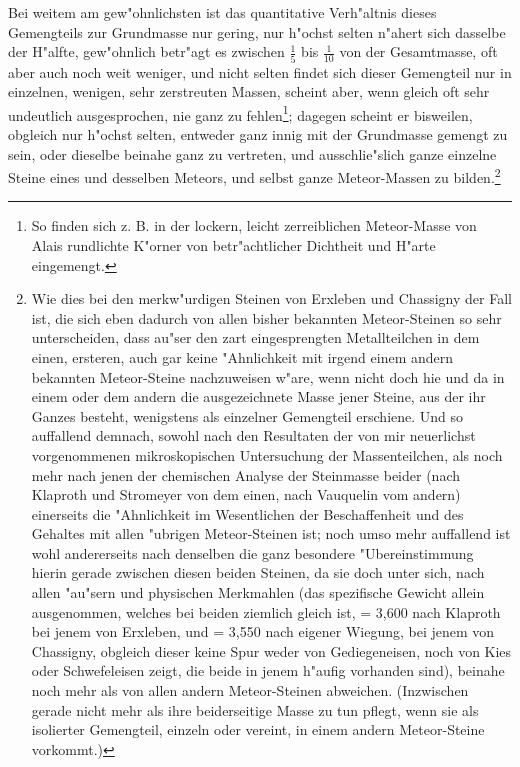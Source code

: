\documentclass[a4paper, 11pt, oneside, german]{article}
\begin{document}
Bei weitem am gew"ohnlichsten ist das quantitative Verh"altnis dieses Gemengteils zur Grundmasse nur gering, nur h"ochst selten n"ahert sich dasselbe der H"alfte, gew"ohnlich betr"agt es zwischen $\frac{1}{5}$ bis $\frac{1}{10}$ von der Gesamtmasse, oft aber auch noch weit weniger, und nicht selten findet sich dieser Gemengteil nur in einzelnen, wenigen, sehr zerstreuten Massen, scheint aber, wenn gleich oft sehr undeutlich ausgesprochen, nie ganz zu fehlen\footnote{So finden sich z. B. in der lockern, leicht zerreiblichen Meteor-Masse von Alais rundlichte K"orner von betr"achtlicher Dichtheit und H"arte eingemengt.}; dagegen scheint er bisweilen, obgleich nur h"ochst selten, entweder ganz innig mit der Grundmasse gemengt zu sein, oder dieselbe beinahe ganz zu vertreten, und ausschlie"slich ganze einzelne Steine eines und desselben Meteors, und selbst ganze Meteor-Massen zu bilden.\footnote{Wie dies bei den merkw"urdigen Steinen von Erxleben und Chassigny der Fall ist, die sich eben dadurch von allen bisher bekannten Meteor-Steinen so sehr unterscheiden, dass au"ser den zart eingesprengten Metallteilchen in dem einen, ersteren, auch gar keine "Ahnlichkeit mit irgend einem andern bekannten Meteor-Steine nachzuweisen w"are, wenn nicht doch hie und da in einem oder dem andern die ausgezeichnete Masse jener Steine, aus der ihr Ganzes besteht, wenigstens als einzelner Gemengteil erschiene. Und so auffallend demnach, sowohl nach den Resultaten der von mir neuerlichst vorgenommenen mikroskopischen Untersuchung der Massenteilchen, als noch mehr nach jenen der chemischen Analyse der Steinmasse beider (nach Klaproth und Stromeyer von dem einen, nach Vauquelin vom andern) einerseits die "Ahnlichkeit im Wesentlichen der Beschaffenheit und des Gehaltes mit allen "ubrigen Meteor-Steinen ist; noch umso mehr auffallend ist wohl andererseits nach denselben die ganz besondere "Ubereinstimmung hierin gerade zwischen diesen beiden Steinen, da sie doch unter sich, nach allen "au"sern und physischen Merkmahlen (das spezifische Gewicht allein ausgenommen, welches bei beiden ziemlich gleich ist, = 3,600 nach Klaproth bei jenem von Erxleben, und = 3,550 nach eigener Wiegung, bei jenem von Chassigny, obgleich dieser keine Spur weder von Gediegeneisen, noch von Kies oder Schwefeleisen zeigt, die beide in jenem h"aufig vorhanden sind), beinahe noch mehr als von allen andern Meteor-Steinen abweichen. (Inzwischen gerade nicht mehr als ihre beiderseitige Masse zu tun pflegt, wenn sie als isolierter Gemengteil, einzeln oder vereint, in einem andern Meteor-Steine vorkommt.)}
\end{document}
